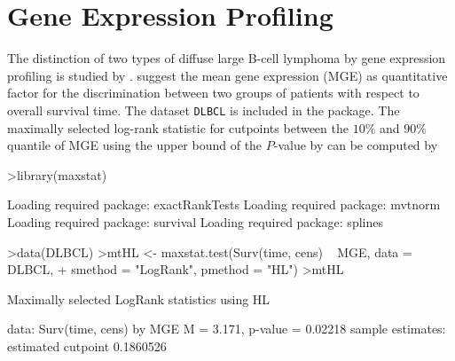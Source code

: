 \documentclass{article}
\renewcommand{\baselinestretch}{1.5}
\begin{document}
\section{Gene Expression Profiling}

The distinction of two types of diffuse
large B-cell lymphoma by gene expression profiling is studied by
\cite{distinct-t:2000}. \cite{on-the-exa:2001} suggest the mean gene
expression (MGE) as quantitative factor for the discrimination between two
groups of patients with respect to overall survival time. The dataset
\texttt{DLBCL} is included in the package.
The maximally selected log-rank statistic for cutpoints between 
the $10\%$ and
$90\%$ quantile of MGE using the upper bound of the
$P$-value by \cite{on-the-exa:2001} can be computed by

\renewcommand{\baselinestretch}{1}
\begin{Schunk}
\begin{Sinput}
>library(maxstat)
\end{Sinput}
\begin{Soutput}
Loading required package: exactRankTests 
Loading required package: mvtnorm 
Loading required package: survival 
Loading required package: splines 
\end{Soutput}
\begin{Sinput}
>data(DLBCL)
>mtHL <- maxstat.test(Surv(time, cens) ~ MGE, data = DLBCL, 
+     smethod = "LogRank", pmethod = "HL")
>mtHL
\end{Sinput}
\begin{Soutput}
	Maximally selected LogRank statistics using HL

data:  Surv(time, cens) by MGE 
M = 3.171, p-value = 0.02218
sample estimates:
estimated cutpoint 
         0.1860526 
\end{Soutput}
\end{Schunk}
\renewcommand{\baselinestretch}{1.5}
\end{document}
